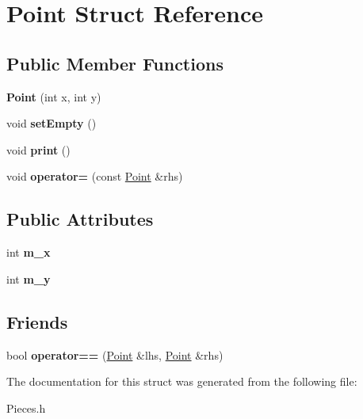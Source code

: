 \hypertarget{struct_point}{\section{Point Struct Reference}
\label{struct_point}
}
\subsection*{Public Member Functions}
\begin{DoxyCompactItemize}
\item 
\hypertarget{struct_point_a001c4958c310b248f5c26037aea38a9c}{{\bfseries Point} (int x, int y)}\label{struct_point_a001c4958c310b248f5c26037aea38a9c}

\item 
\hypertarget{struct_point_a26844fd8368a6c5d34713d8ac1185fbe}{void {\bfseries set\-Empty} ()}\label{struct_point_a26844fd8368a6c5d34713d8ac1185fbe}

\item 
\hypertarget{struct_point_a76c5855c06d98aed16b5796a9a50bbee}{void {\bfseries print} ()}\label{struct_point_a76c5855c06d98aed16b5796a9a50bbee}

\item 
\hypertarget{struct_point_a5bb149491b3759746415a8ed97d63d25}{void {\bfseries operator=} (const \hyperlink{struct_point}{Point} \&rhs)}\label{struct_point_a5bb149491b3759746415a8ed97d63d25}

\end{DoxyCompactItemize}
\subsection*{Public Attributes}
\begin{DoxyCompactItemize}
\item 
\hypertarget{struct_point_a885daee8c5064cd51f6a4c3888091fc9}{int {\bfseries m\-\_\-x}}\label{struct_point_a885daee8c5064cd51f6a4c3888091fc9}

\item 
\hypertarget{struct_point_a00e243381d01e186dc2fcc5d24b4d3be}{int {\bfseries m\-\_\-y}}\label{struct_point_a00e243381d01e186dc2fcc5d24b4d3be}

\end{DoxyCompactItemize}
\subsection*{Friends}
\begin{DoxyCompactItemize}
\item 
\hypertarget{struct_point_a75de5fa7971bc4ffdd3c5d06d776495c}{bool {\bfseries operator==} (\hyperlink{struct_point}{Point} \&lhs, \hyperlink{struct_point}{Point} \&rhs)}\label{struct_point_a75de5fa7971bc4ffdd3c5d06d776495c}

\end{DoxyCompactItemize}


The documentation for this struct was generated from the following file\-:\begin{DoxyCompactItemize}
\item 
Pieces.\-h\end{DoxyCompactItemize}
